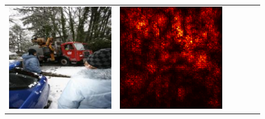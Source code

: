 \documentclass[preprint,12pt]{elsarticle}
\begin{document}
\begin{figure}[p]
\begin{tabular}{cccccc}
  \includegraphics[scale=\scale]{../visualizations/examples/imagenette/cnn/images/1.png} &
  \includegraphics[scale=\scale]{../visualizations/examples/imagenette/cnn/saliency_map/1.png} & 

\end{tabular}
\end{figure}
\end{document}
